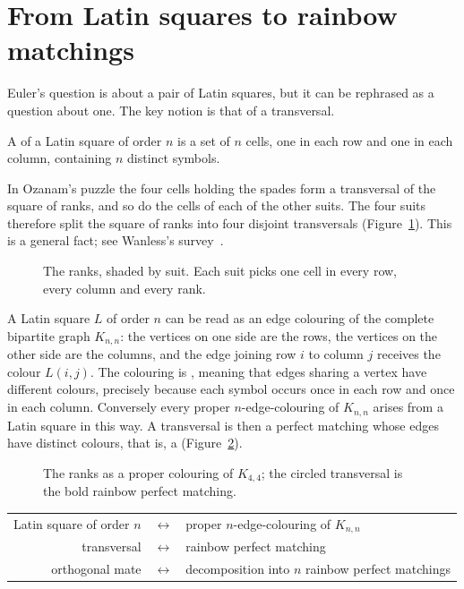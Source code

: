 \section{From Latin squares to rainbow matchings}\label{sec:rainbow}

Euler's question is about a pair of Latin squares, but it can be rephrased as a question about one. The key notion is that of a transversal.

\begin{definition}\label{def:transversal}
A  of a Latin square of order $n$ is a set of $n$ cells, one in each row and one in each column, containing $n$ distinct symbols.
\end{definition}

In Ozanam's puzzle the four cells holding the spades form a transversal of the square of ranks, and so do the cells of each of the other suits. The four suits therefore split the square of ranks into four disjoint transversals (Figure~\ref{fig:suit-transversals}). This is a general fact; see Wanless's survey~\cite{wan07}.

\begin{figure}[ht]
\centering

\caption{The ranks, shaded by suit. Each suit picks one cell in every row, every column and every rank.}
\label{fig:suit-transversals}
\end{figure}


A Latin square $L$ of order $n$ can be read as an edge colouring of the complete bipartite graph $K_{n,n}$: the vertices on one side are the rows, the vertices on the other side are the columns, and the edge joining row $i$ to column $j$ receives the colour $L(i,j)$. The colouring is , meaning that edges sharing a vertex have different colours, precisely because each symbol occurs once in each row and once in each column. Conversely every proper $n$-edge-colouring of $K_{n,n}$ arises from a Latin square in this way. A transversal is then a perfect matching whose edges have distinct colours, that is, a  (Figure~\ref{fig:ranks-knn}).

\begin{figure}[ht]
\centering

\caption{The ranks as a proper colouring of $K_{4,4}$; the circled transversal is the bold rainbow perfect matching.}
\label{fig:ranks-knn}
\end{figure}

\begin{center}
\renewcommand{\arraystretch}{1.3}
\begin{tabular}{rcl}
Latin square of order $n$ & $\longleftrightarrow$ & proper $n$-edge-colouring of $K_{n,n}$\\
transversal & $\longleftrightarrow$ & rainbow perfect matching\\
orthogonal mate & $\longleftrightarrow$ & decomposition into $n$ rainbow perfect matchings
\end{tabular}
\end{center}


